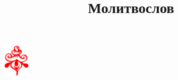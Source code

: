 \documentclass[12pt,oneside, a4paper]{book}
\title{\Huge\bfseries Молитвослов}
\author{}
\date{}
\begin{document}
\maketitle
\tableofcontents



\nopagebreak
\begin{center}
\includegraphics[width=0.1\textwidth]{uzor_end_red}
\end{center}
\end{document}
